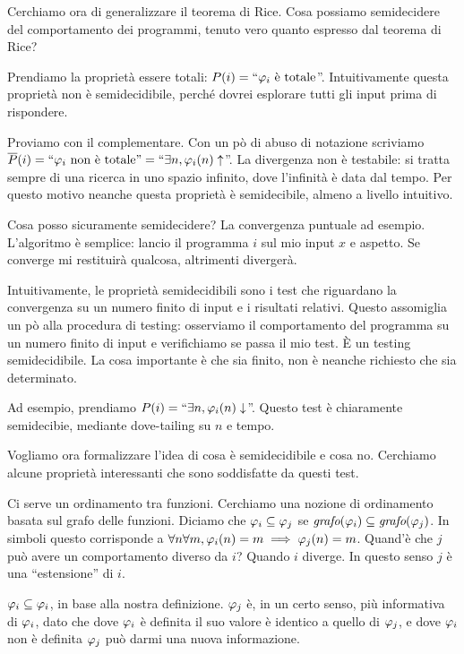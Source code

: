 Cerchiamo ora di generalizzare il teorema di Rice. Cosa possiamo semidecidere del comportamento dei
programmi, tenuto vero quanto espresso dal teorema di Rice?

Prendiamo la proprietà essere totali: $P(i) = ``\varphi_{i} \text{ è totale}$''. Intuitivamente questa proprietà non
è semidecidibile, perché dovrei esplorare tutti gli input prima di rispondere.

Proviamo con il complementare. Con un pò di abuso di notazione scriviamo $\overline{P}(i) = ``\varphi_{i}
\text{ non è totale''} = ``\exists n, \varphi_{i}(n) \uparrow$''. La divergenza non è testabile: si tratta
sempre di una ricerca in uno spazio infinito, dove l'infinità è data dal tempo. Per questo motivo
neanche questa proprietà è semidecibile, almeno a livello intuitivo.

Cosa posso sicuramente semidecidere? La convergenza puntuale ad esempio. L'algoritmo è semplice:
lancio il programma $i$ sul mio input $x$ e aspetto. Se converge mi restituirà qualcosa, altrimenti
divergerà.

Intuitivamente, le proprietà semidecidibili sono i test che riguardano la convergenza su un numero
finito di input e i risultati relativi. Questo assomiglia un pò alla procedura di testing:
osserviamo il comportamento del programma su un numero finito di input e verifichiamo se passa il
mio test. È un testing semidecidibile. La cosa importante è che sia finito, non è neanche
richiesto che sia determinato.

Ad esempio, prendiamo $P(i) = ``\exists n, \varphi_{i}(n) \downarrow$''. Questo test è chiaramente
semidecibie, mediante dove-tailing su $n$ e tempo.

Vogliamo ora formalizzare l'idea di cosa è semidecidibile e cosa no. Cerchiamo alcune proprietà
interessanti che sono soddisfatte da questi test.

Ci serve un ordinamento tra funzioni. Cerchiamo una nozione di ordinamento basata sul grafo delle
funzioni. Diciamo che $\varphi_{i} \subseteq \varphi_{j}$ se $\textit{grafo}(\varphi_{i}) \subseteq
\textit{grafo}(\varphi_{j})$. In simboli questo corrisponde a $\forall n \forall m, \varphi_{i}(n) = m \implies
\varphi_{j}(n) = m$. Quand'è che $j$ può avere un comportamento diverso da $i$? Quando $i$ diverge. In
questo senso $j$ è una ``estensione'' di $i$.

$\varphi_{i} \subseteq \varphi_{i}$, in base alla nostra definizione. $\varphi_{j}$ è, in un certo senso, più
informativa di $\varphi_{i}$, dato che dove $\varphi_{i}$ è definita il suo valore è identico a quello di
$\varphi_{j}$, e dove $\varphi_{i}$ non è definita $\varphi_{j}$ può darmi una nuova informazione.


